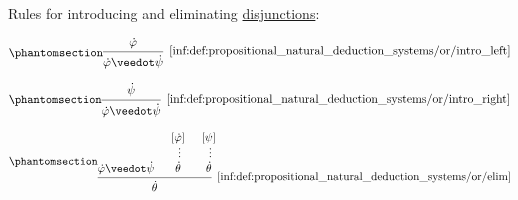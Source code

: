 \begin{definition}
\begin{thmenum}
     Rules for introducing and eliminating \hyperref[def:propositional_alphabet/connectives/disjunction]{disjunctions}:
    \begin{paracol}{3}
      \begin{nthcolumn}{0}
        \begin{equation*}\taglabel[\ensuremath{ \vee^{+L} }]{inf:def:propositional_natural_deduction_systems/or/intro_left}
          \begin{prooftree}
            \hypo{ \syn\varphi }
            \infer1[\ref{inf:def:propositional_natural_deduction_systems/or/intro_left}]{ \syn\varphi \synvee \syn\psi }
          \end{prooftree}
        \end{equation*}
      \end{nthcolumn}

      \begin{nthcolumn}{1}
        \begin{equation*}\taglabel[\ensuremath{ \vee^{+R} }]{inf:def:propositional_natural_deduction_systems/or/intro_right}
          \begin{prooftree}
            \hypo{ \syn\psi }
            \infer1[\ref{inf:def:propositional_natural_deduction_systems/or/intro_right}]{ \syn\varphi \synvee \syn\psi }
          \end{prooftree}
        \end{equation*}
      \end{nthcolumn}

      \begin{nthcolumn}{2}
        \begin{equation*}\taglabel[\ensuremath{ \vee^- }]{inf:def:propositional_natural_deduction_systems/or/elim}
          \begin{prooftree}
            \hypo{ \syn\varphi \synvee \syn\psi }
            \hypo{ [\syn\varphi] }
            \ellipsis {} { \syn\theta }
            \hypo{ [\psi] }
            \ellipsis {} { \syn\theta }
            \infer3[\ref{inf:def:propositional_natural_deduction_systems/or/elim}]{ \syn\theta }
          \end{prooftree}
        \end{equation*}
      \end{nthcolumn}
    \end{paracol}


\end{thmenum}
\end{definition}
